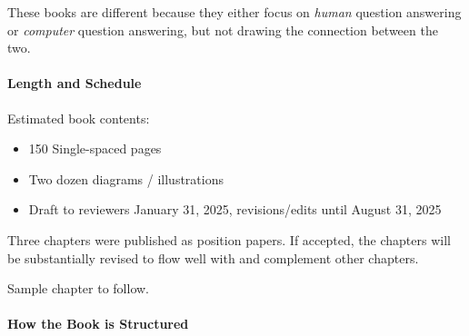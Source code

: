 These books are different because they either focus on \emph{human}
question answering or \emph{computer} question answering, but not
drawing the connection between the two.

\paragraph{Length and Schedule}

Estimated book contents:
\begin{itemize}
  \item 150 Single-spaced pages
  \item Two dozen diagrams / illustrations
  \item Draft to reviewers January 31, 2025, revisions/edits until
    August 31, 2025
\end{itemize}

Three chapters were published as position papers.  If accepted, the
chapters will be substantially revised to flow well with and
complement other chapters.

Sample chapter to follow.

\paragraph{How the Book is Structured}



